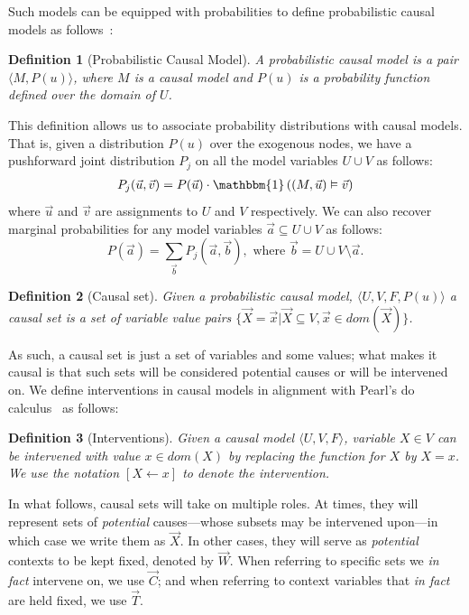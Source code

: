 \documentclass{article}
\newtheorem{definition}{Definition}
\begin{document}
Such models can be  equipped with probabilities to define probabilistic causal models as follows~\cite{causalityPearl}:
\begin{definition}[Probabilistic Causal Model]
    A probabilistic causal model is a pair \(\langle M, P(u) \rangle\), where \(M\) is a causal model and \(P(u)\) is a probability function defined over the domain of \(U\).
\end{definition}

This definition allows us to associate probability distributions with causal models. That is, given a distribution $P(u)$ over the exogenous nodes, we have a pushforward joint distribution \(P_j\) on all the model variables \(U \cup V\) as follows:
\begin{align} \label{eq:joint} P_j(\vec{u}, \vec{v}) = P(\vec{u}) \cdot \mathbbm{1}\left ( (M, \vec{u}) \vDash \vec{v}\right)\end{align}
where \(\vec{u}\) and \(\vec{v}\) are assignments to \(U\) and \(V\) respectively. We can also recover marginal probabilities for any model variables $\vec{a} \subseteq U\cup V$ as follows:
\[
P(\vec{a}) = \sum_{\vec{b}} P_j(\vec{a}, \vec{b}), \mbox{  where } \vec{b} = U\cup V \setminus \vec{a}.
\]


\begin{definition}[Causal set]
    Given a probabilistic causal model, \(\langle U, V, F, P(u)\rangle\) a causal set is a set of variable value pairs \(\{\vec{X} = \vec{x} | \vec{X} \subseteq  V, \vec{x} \in \mathit{dom}(\vec{X})\}\). 
\end{definition}

As such, a causal set is just a set of variables and some values; what makes it causal is that such sets will be considered potential causes or will be intervened on. 
We define interventions in causal models in alignment with Pearl's do calculus~\cite{causalityPearl}  as follows:

\begin{definition}[Interventions]
    Given a causal model \(\langle U, V, F \rangle\), variable \(X \in V\) can be intervened with value \(x \in \textit{dom}(X)\) by replacing the function for \(X\) by \(X = x\). We use the notation \([X \leftarrow x]\) to denote the intervention.
\end{definition}

In what follows, causal sets will take on multiple roles. At times, they will represent sets of \emph{potential} causes---whose subsets may be intervened upon---in which case we write them as $\vec{X}$. In other cases, they will serve as \emph{potential} contexts to be kept fixed, denoted by $\vec{W}$. When referring to specific sets we \emph{in fact} intervene on, we use $\vec{C}$; and when referring to context variables that \emph{in fact} are held fixed, we use $\vec{T}$.
\end{document}
